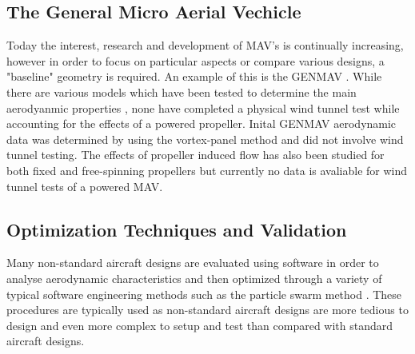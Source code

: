 \subsection{The General Micro Aerial Vechicle}
\label{subsec:GenMAV}
Today the interest, research and development of MAV's is continually increasing, however in order to focus on particular aspects or compare various designs, a "baseline" geometry is required. An example of this is the GENMAV \cite{Stewart2007}. While there are various models which have been tested to determine the main aerodyanmic properties \cite{Stewart2007}, none have completed a physical wind tunnel test while accounting for the effects of a powered propeller. Inital GENMAV aerodynamic data was determined by using the vortex-panel method \cite{Stewart2007} and did not involve wind tunnel testing. The effects of propeller induced flow has also been studied for both fixed and free-spinning propellers but currently no data is avaliable for wind tunnel tests of a powered MAV.

\subsection{Optimization Techniques and Validation}
\label{subsec:Optimization}
Many non-standard aircraft designs are evaluated using software in order to analyse aerodynamic characteristics and then optimized through a variety of typical software engineering methods such as the particle swarm method \cite{Gomez2020}. These procedures are typically used as non-standard aircraft designs are more tedious to design and even more complex to setup and test than compared with standard aircraft designs. 


